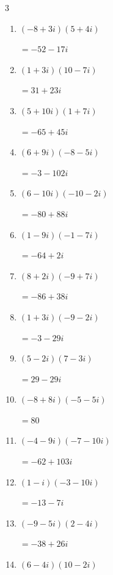 \begin{multicols}{3}
\begin{enumerate}
  \item $\displaystyle (-8+3i)(5+4i)$

        $\displaystyle =-52-17i$

  \item $\displaystyle (1+3i)(10-7i)$

        $\displaystyle =31+23i$

  \item $\displaystyle (5+10i)(1+7i)$

        $\displaystyle =-65+45i$

  \item $\displaystyle (6+9i)(-8-5i)$

        $\displaystyle =-3-102i$

  \item $\displaystyle (6-10i)(-10-2i)$

        $\displaystyle =-80+88i$

  \item $\displaystyle (1-9i)(-1-7i)$

        $\displaystyle =-64+2i$

  \item $\displaystyle (8+2i)(-9+7i)$

        $\displaystyle =-86+38i$

  \item $\displaystyle (1+3i)(-9-2i)$

        $\displaystyle =-3-29i$

  \item $\displaystyle (5-2i)(7-3i)$

        $\displaystyle =29-29i$

  \item $\displaystyle (-8+8i)(-5-5i)$

        $\displaystyle =80$

  \item $\displaystyle (-4-9i)(-7-10i)$

        $\displaystyle =-62+103i$

  \item $\displaystyle (1-i)(-3-10i)$

        $\displaystyle =-13-7i$

  \item $\displaystyle (-9-5i)(2-4i)$

        $\displaystyle =-38+26i$

  \item $\displaystyle (6-4i)(10-2i)$


\end{enumerate}
\end{multicols}
